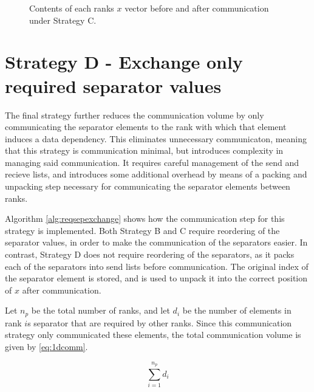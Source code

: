 \begin{figure}[H]
    \centering
    \caption{Contents of each ranks \(x\) vector before and after communication under Strategy C.}
    \label{fig:1ccomm}
\end{figure}

\section{Strategy D - Exchange only required separator values}
The final strategy further reduces the communication volume by only communicating the separator elements to the rank with which that element induces a data dependency. This eliminates unnecessary communicaton, meaning that this strategy is communication minimal, but introduces complexity in managing said communication. It requires careful management of the send and recieve lists, and introduces some additional overhead by means of a packing and unpacking step necessary for communicating the separator elements between ranks. %
\medskip

Algorithm \ref{alg:reqsepexchange} shows how the communication step for this strategy is implemented. Both Strategy B and C require reordering of the separator values, in order to make the communication of the separators easier. In contrast, Strategy D does not require reordering of the separators, as it packs each of the separators into send lists before communication. The original index of the separator element is stored, and is used to unpack it into the correct position of \(x\) after communication.
\medskip

Let \(n_{p}\) be the total number of ranks, and let \(d_{i}\) be the number of elements in rank \(i\)s separator that are required by other ranks. Since this communication strategy only communicated these elements, the total communication volume is given by \ref{eq:1dcomm}.

\begin{equation}
    \label{eq:1dcomm}
    \sum_{i=1}^{n_{p}} d_{i} 
\end{equation}

